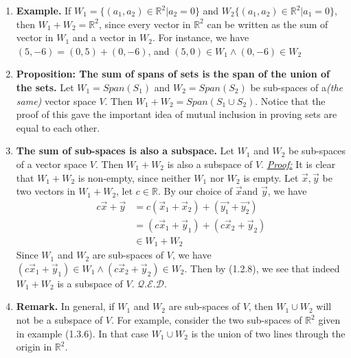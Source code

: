 \documentclass[oneside, 12pt]{book}
\newcommand{\settag}[1]{\renewcommand{\theenumi}{#1}}
\newcommand{\R}{\mathbb{R}}
\newcommand{\qed}{\hfill $\mathcal{Q}.\mathcal{E}.\mathcal{D}.$}
\begin{document}
\begin{enumerate}
        \settag{1.3.6}
        \item \textbf{Example.} If $W_1 = \{(a_1, a_2)\in \R^2|a_2 = 0\}$ and $W_2 \{(a_1, a_2)\in \R^2|a_1 = 0\}$, then $W_1 + W_2= \R^2$, since every vector in $\R^2$ can be written as the sum of vector in $W_1$ and a vector in $W_2$. For instance, we have $(5, -6)=(0, 5)+(0, -6)$, and $(5, 0)\in W_1 \wedge (0, -6)\in W_2$
        
        
        \settag{1.3.8} 
        \item \textbf{Proposition: The sum of spans of sets is the span of the union of the sets.} Let $W_1 = Span(S_1)$ and $W_2 = Span(S_2)$ be sub-spaces of a\textit{(the same)} vector space $V$. Then $W_1 + W_2 = Span(S_1 \cup S_2)$. Notice that the proof of this gave the important idea of mutual inclusion in proving sets are equal to each other.
        
        \settag{1.3.9}
        \item \textbf{The sum of sub-spaces is also a subspace.} Let $W_1$ and $W_2$ be sub-spaces of a vector space $V$. Then $W_1 + W_2$ is also a subspace of $V$.\newline
        \underline{\textit{Proof:}}\newline
        It is clear that $W_1 + W_2$ is non-empty, since neither $W_1$ nor $W_2$ is empty. Let $\vec{x}, \vec{y}$ be two vectors in $W_1+W_2$, let $c\in \R$. By our choice of $\vec{x}\text{and } \vec{y}$, we have
        \begin{align*}
            c\vec{x} + \vec{y} & = c(\vec{x}_1 + \vec{x}_2) + (\vec{y_1} + \vec{y_2}) \\
            & = (c\vec{x}_1 + \vec{y}_1) + (c\vec{x}_2 + \vec{y}_2) \\
            &\in W_1+W_2
        \end{align*}
        Since $W_1$ and $W_2$ are sub-spaces of $V$, we have $(c\vec{x}_1 + \vec{y}_1) \in W_1\wedge (c\vec{x}_2 + \vec{y}_2)\in W_2$. Then by (1.2.8), we see that indeed $W_1 + W_2$ is a subspace of $V$. \qed
        
        \settag{1.3.10}
        \item \textbf{Remark.} In general, if $W_1$ and $W_2$ are sub-spaces of $V$, then $W_1 \cup W_2$ will not be a subspace of $V$. For example, consider the two sub-spaces of $\R^2$ given in example (1.3.6). In that case $W_1\cup W_2$ is the union of two lines through the origin in $\R^2$. 
        

\end{enumerate}
\end{document}
